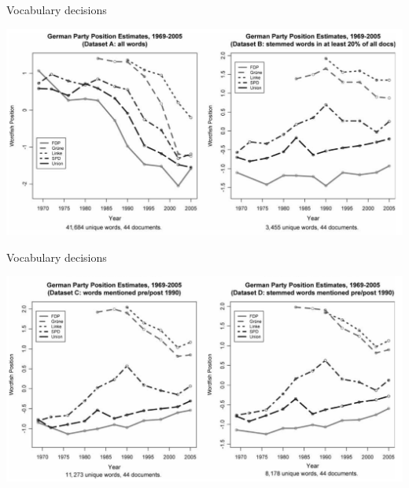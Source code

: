 \documentclass{hertieteaching}
\begin{document}
\begin{frame}{Vocabulary decisions}
\medskip
\centerline{\includegraphics[scale=0.55]{pictures/proksch-de-comparable-1}}
\end{frame}

\begin{frame}{Vocabulary decisions}
\medskip
\centerline{\includegraphics[scale=0.55]{pictures/proksch-de-comparable-2}}
\end{frame}
\end{document}
